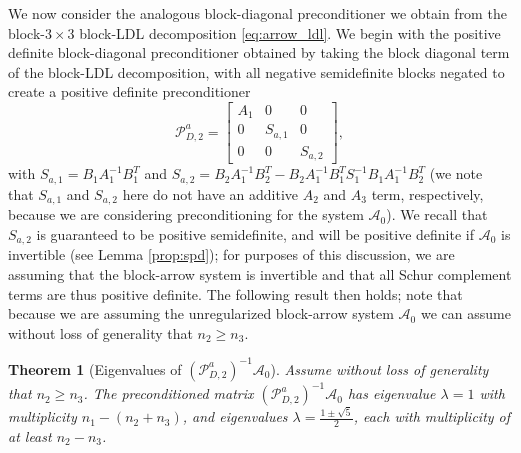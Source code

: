 \documentclass{article}
\newtheorem{theorem}{Theorem}
\newcommand{\sA}{\mathcal{A}}
\begin{document}
We now consider the analogous block-diagonal preconditioner we obtain from the block-$3 \times 3$ block-LDL decomposition \eqref{eq:arrow_ldl}. We begin with the positive definite block-diagonal preconditioner obtained by taking the block diagonal  term of the block-LDL decomposition, with all negative semidefinite blocks negated to create a positive definite preconditioner
$$
\mathcal{P}_{D,2}^{a} = \begin{bmatrix}
    A_1 & 0 & 0 \\
    0 & S_{a,1} & 0 \\
    0 & 0 & S_{a,2}
\end{bmatrix},
$$
with $S_{a,1} = B_1A_1^{-1}B_1^T$ and $S_{a,2} = B_2A_1^{-1}B_2^T - B_2A_1^{-1}B_1^T S_1^{-1}B_1A_1^{-1}B_2^T$ (we note that $S_{a,1}$ and $S_{a,2}$ here do not have an additive $A_2$ and $A_3$ term, respectively, because we are considering preconditioning for the system $\sA_0$). We recall that $S_{a,2}$ is guaranteed to be positive semidefinite, and will be positive definite if $\sA_0$ is invertible (see Lemma \ref{prop:spd}); for purposes of this discussion, we are assuming that the block-arrow system is invertible and that all Schur complement terms are thus positive definite.
The following result then holds; note that because we are assuming the unregularized block-arrow system $\sA_0$ we can assume without loss of generality that $n_2 \ge n_3$. 
\begin{theorem}[Eigenvalues of $(\mathcal{P}_{D,2}^a)^{-1} \sA_0$]
Assume without loss of generality that $n_2 \ge n_3$. The preconditioned matrix $(\mathcal{P}_{D,2}^a)^{-1} \sA_0$ has eigenvalue $\lambda = 1$ with multiplicity $n_1-(n_2+n_3)$, and eigenvalues $\lambda = \frac{1 \pm \sqrt{5}}{2}$, each with multiplicity of at least $n_2-n_3$.
\end{theorem}
\end{document}
